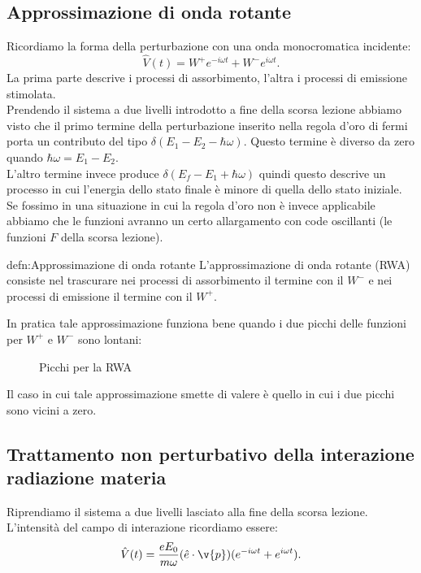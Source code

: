 \subsection{Approssimazione di onda rotante}%
\label{sub:Approssimazione di onda rotante}
Ricordiamo la forma della perturbazione con una onda monocromatica incidente:
\[
    \hat{V}(t) = W^+ e^{-i\omega t}+W^-e^{i\omega t}
.\] 
La prima parte descrive i processi di assorbimento, l'altra i processi di emissione stimolata.\\
Prendendo il sistema a due livelli introdotto a fine della scorsa lezione abbiamo visto che il primo termine della perturbazione inserito nella regola d'oro di fermi porta un contributo del tipo  $\delta (E_1-E_2-\hbar \omega) $. Questo termine è diverso da zero quando $\hbar \omega = E_1 -E_2$.\\
L'altro termine invece produce $\delta (E_f-E_1 + \hbar \omega)$ quindi questo descrive un processo in cui l'energia dello stato finale è minore di quella dello stato iniziale.\\
Se fossimo in una situazione in cui la regola d'oro non è invece applicabile abbiamo che le funzioni avranno un certo allargamento con code oscillanti (le funzioni $F$ della scorsa lezione). 
\begin{defn}{defn:Approssimazione di onda rotante}
L'approssimazione di onda rotante (RWA) consiste nel trascurare nei processi di assorbimento il termine con il $W^-$ e nei processi di emissione il termine con il $W^+$.
\end{defn}
In pratica tale approssimazione funziona bene quando i due picchi delle funzioni per $W^+$ e $W^-$ sono lontani:
\begin{figure}[ht]
    \centering
    \caption{Picchi per la RWA}
    \label{fig:picchi-per-la-rwa}
\end{figure}
Il caso in cui tale approssimazione smette di valere è quello in cui i due picchi sono vicini a zero.\\
\subsection{Trattamento non perturbativo della interazione radiazione materia}%
\label{sub:Trattamento non perturbativo della interazione radiazione materia}
Riprendiamo il sistema a due livelli lasciato alla fine della scorsa lezione. L'intensità del campo di interazione ricordiamo essere:
\[
    \hat{V}(t) = \frac{eE_0}{m\omega}(\hat{e}\cdot \v{p}) (e^{-i\omega t}+e^{i\omega t}) 
.\] 

